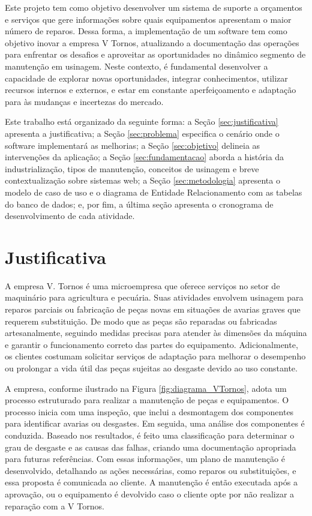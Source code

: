 Este projeto tem como objetivo desenvolver um sistema de suporte a orçamentos e serviços que gere informações sobre quais equipamentos apresentam o maior número de reparos. Dessa forma, a implementação de um software tem como objetivo inovar a empresa V Tornos, atualizando a documentação das operações para enfrentar os desafios e aproveitar as oportunidades no dinâmico segmento de manutenção em usinagem. Neste contexto, é fundamental desenvolver a capacidade de explorar novas oportunidades, integrar conhecimentos, utilizar recursos internos e externos, e estar em constante aperfeiçoamento e adaptação para às mudanças e incertezas do mercado.


Este trabalho está organizado da seguinte forma: a Seção \ref{sec:justificativa} apresenta a justificativa; a Seção \ref{sec:problema} especifica o cenário onde o software implementará as melhorias; a Seção \ref{sec:objetivo} delineia as intervenções da aplicação; a Seção \ref{sec:fundamentacao} aborda a história da industrialização, tipos de manutenção, conceitos de usinagem e breve contextualização sobre sistemas web; a Seção \ref{sec:metodologia} apresenta o modelo de caso de uso e o diagrama de Entidade Relacionamento com as tabelas do banco de dados; e, por fim, a última seção apresenta o cronograma de desenvolvimento de cada atividade.

\section{Justificativa}
\label{sec:Justificativa}

A empresa V. Tornos é uma microempresa que oferece serviços no setor de maquinário para agricultura e pecuária. Suas atividades envolvem usinagem para reparos parciais ou fabricação de peças novas em situações de avarias graves que requerem substituição. De modo que as peças são reparadas ou fabricadas artesanalmente, seguindo medidas precisas para atender às dimensões da máquina e garantir o funcionamento correto das partes do equipamento. Adicionalmente, os clientes costumam solicitar serviços de adaptação para melhorar o desempenho ou prolongar a vida útil das peças sujeitas ao desgaste devido ao uso constante.

A empresa, conforme ilustrado na Figura \ref{fig:diagrama_VTornos}, adota um processo estruturado para realizar a manutenção de peças e equipamentos. O processo inicia com uma inspeção, que inclui a desmontagem dos componentes para identificar avarias ou desgastes. Em seguida, uma análise dos componentes é conduzida. Baseado nos resultados, é feito uma classificação para determinar o grau de desgaste e as causas das falhas, criando uma documentação apropriada para futuras referências. Com essas informações, um plano de manutenção é desenvolvido, detalhando as ações necessárias, como reparos ou substituições, e essa proposta é comunicada ao cliente. A manutenção é então executada após a aprovação, ou o equipamento é devolvido caso o cliente opte por não realizar a reparação com a V Tornos.

